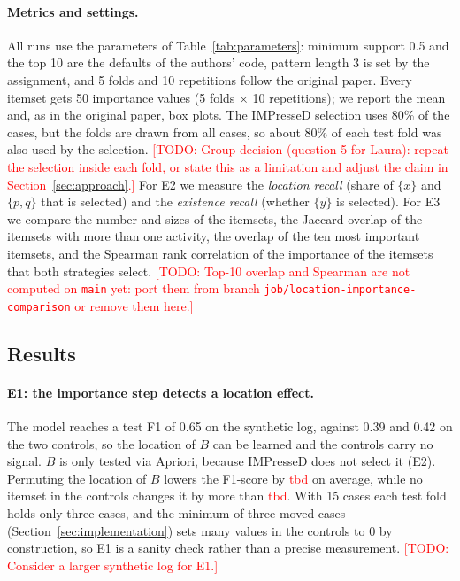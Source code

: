\documentclass{article}
\newcommand{\todo}[1]{\textcolor{red}{[TODO: #1]}}
\newcommand{\tbd}{\textcolor{red}{tbd}}
\begin{document}
\paragraph{Metrics and settings.} All runs use the parameters of Table~\ref{tab:parameters}: minimum support 0.5 and the top 10 are the defaults of the authors' code, pattern length 3 is set by the assignment, and 5 folds and 10 repetitions follow the original paper. Every itemset gets 50 importance values (5 folds $\times$ 10 repetitions); we report the mean and, as in the original paper, box plots. The IMPresseD selection uses 80\% of the cases, but the folds are drawn from all cases, so about 80\% of each test fold was also used by the selection. \todo{Group decision (question 5 for Laura): repeat the selection inside each fold, or state this as a limitation and adjust the claim in Section~\ref{sec:approach}.} For E2 we measure the \emph{location recall} (share of $\{x\}$ and $\{p,q\}$ that is selected) and the \emph{existence recall} (whether $\{y\}$ is selected). For E3 we compare the number and sizes of the itemsets, the Jaccard overlap of the itemsets with more than one activity, the overlap of the ten most important itemsets, and the Spearman rank correlation of the importance of the itemsets that both strategies select. \todo{Top-10 overlap and Spearman are not computed on \texttt{main} yet: port them from branch \texttt{job/location-importance-comparison} or remove them here.}

\subsection{Results}

\paragraph{E1: the importance step detects a location effect.} The model reaches a test F1 of 0.65 on the synthetic log, against 0.39 and 0.42 on the two controls, so the location of $B$ can be learned and the controls carry no signal. $B$ is only tested via Apriori, because IMPresseD does not select it (E2). Permuting the location of $B$ lowers the F1-score by \tbd{} on average, while no itemset in the controls changes it by more than \tbd{}. With 15 cases each test fold holds only three cases, and the minimum of three moved cases (Section~\ref{sec:implementation}) sets many values in the controls to 0 by construction, so E1 is a sanity check rather than a precise measurement. \todo{Consider a larger synthetic log for E1.}
\end{document}
